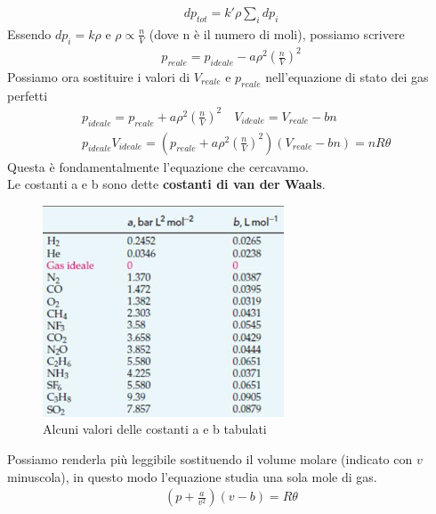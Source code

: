 \documentclass[10pt,a4paper]{article}
\begin{document}
\begin{align*}
	dp_{tot} = k' \rho \sum_i dp_i 
\end{align*}
Essendo $dp_i = k \rho$ e $\rho \propto \frac{n}{V}$ (dove n è il numero di moli), possiamo scrivere
\begin{align*}
p_{reale} = p_{ideale}- a \rho^2 \left(\frac{n}{V}\right)^2
\end{align*}
Possiamo ora sostituire i valori di $V_{reale}$ e $p_{reale}$ nell'equazione di stato dei gas perfetti
\begin{align*}
	& p_{ideale} = p_{reale} + a \rho^2 \left(\frac{n}{V}\right)^2 \quad V_{ideale} = V_{reale} - b n\\
	& p_{ideale} V_{ideale} = \left(p_{reale} + a \rho^2 \left(\frac{n}{V}\right)^2 \right) \left( V_{reale} - b n \right) = n R \theta 
\end{align*}
Questa è fondamentalmente l'equazione che cercavamo.\\
Le costanti a e b sono dette \textbf{costanti di van der Waals}.
\begin{figure}[h!]
	\centering
	\includegraphics[width=0.5\linewidth]{costantiaeb}
	\caption{Alcuni valori delle costanti a e b tabulati}
	\label{fig:costantiaeb}
\end{figure}
\FloatBarrier
Possiamo renderla più leggibile sostituendo il volume molare (indicato con $v$ minuscola), in questo modo l'equazione studia una sola mole di gas.  
\begin{align*}
\left( p + \frac{a}{v^2}\right)\left(v-b\right) = R \theta
\end{align*}
\end{document}
